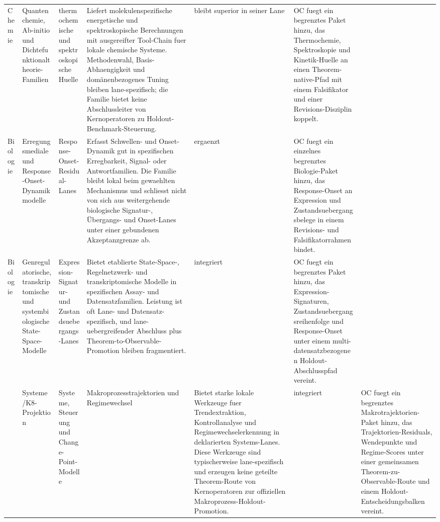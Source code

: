 \begin{longtable}{@{}L{0.09\textwidth}L{0.14\textwidth}L{0.12\textwidth}L{0.23\textwidth}L{0.12\textwidth}L{0.22\textwidth}@{}}
Chemie & Quantenchemie, Ab-initio und Dichtefunktionaltheorie-Familien & thermochemische und spektroskopische Huelle & Liefert molekulenspezifische energetische und spektroskopische Berechnungen mit ausgereifter Tool-Chain fuer lokale chemische Systeme. \allowbreak Methodenwahl, Basis-Abhaengigkeit und domänenbezogenes Tuning bleiben lane-spezifisch; die Familie bietet keine Abschlussleiter von Kernoperatoren zu Holdout-Benchmark-Steuerung. & bleibt superior in seiner Lane & OC fuegt ein begrenztes Paket hinzu, das Thermochemie, Spektroskopie und Kinetik-Huelle an einen Theorem-native-Pfad mit einem Falsifikator und einer Revisions-Disziplin koppelt. \\
Biologie & Erregungsmediale und Response-Onset-Dynamikmodelle & Response-Onset-Residual-Lanes & Erfasst Schwellen- und Onset-Dynamik gut in spezifischen Erregbarkeit, Signal- oder Antwortfamilien. \allowbreak Die Familie bleibt lokal beim gewaehlten Mechanismus und schliesst nicht von sich aus weitergehende biologische Signatur-, Übergangs- und Onset-Lanes unter einer gebundenen Akzeptanzgrenze ab. & ergaenzt & OC fuegt ein einzelnes begrenztes Biologie-Paket hinzu, das Response-Onset an Expression und Zustandsuebergangsbelege in einem Revisions- und Falsifikatorrahmen bindet. \\
Biologie & Genregulatorische, transkriptomische und systembiologische State-Space-Modelle & Expression-Signatur- und Zustandsuebergangs-Lanes & Bietet etablierte State-Space-, Regelnetzwerk- und transkriptomische Modelle in spezifischen Assay- und Datensatzfamilien. \allowbreak Leistung ist oft Lane- und Datensatz-spezifisch, und lane-uebergreifender Abschluss plus Theorem-to-Observable-Promotion bleiben fragmentiert. & integriert & OC fuegt ein begrenztes Paket hinzu, das Expression-Signaturen, Zustandsuebergangsreihenfolge und Response-Onset unter einem multi-datensatzbezogenen Holdout-Abschlusspfad vereint. \\
 & Systeme /\allowbreak K8-Projektion & Systeme, Steuerung und Change-Point-Modelle & Makroprozesstrajektorien und Regimewechsel & Bietet starke lokale Werkzeuge fuer Trendextraktion, Kontrollanalyse und Regimewechselerkennung in deklarierten Systems-Lanes. \allowbreak Diese Werkzeuge sind typischerweise lane-spezifisch und erzeugen keine geteilte Theorem-Route von Kernoperatoren zur offiziellen Makroprozess-Holdout-Promotion. & integriert & OC fuegt ein begrenztes Makrotrajektorien-Paket hinzu, das Trajektorien-Residuals, Wendepunkte und Regime-Scores unter einer gemeinsamen Theorem-zu-Observable-Route und einem Holdout-Entscheidungsbalken vereint. \\

\end{longtable}
